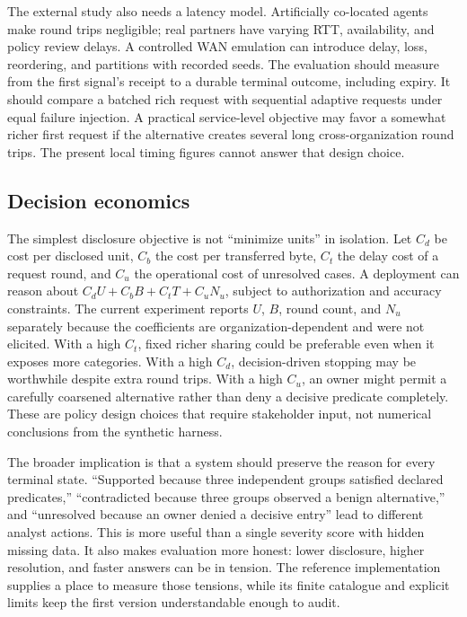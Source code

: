 \documentclass[conference,letterpaper]{IEEEtran}
\begin{document}
The external study also needs a latency model. Artificially co-located agents make round trips negligible; real partners have varying RTT, availability, and policy review delays. A controlled WAN emulation can introduce delay, loss, reordering, and partitions with recorded seeds. The evaluation should measure from the first signal's receipt to a durable terminal outcome, including expiry. It should compare a batched rich request with sequential adaptive requests under equal failure injection. A practical service-level objective may favor a somewhat richer first request if the alternative creates several long cross-organization round trips. The present local timing figures cannot answer that design choice.

\subsection{Decision economics}
The simplest disclosure objective is not ``minimize units'' in isolation. Let $C_d$ be cost per disclosed unit, $C_b$ the cost per transferred byte, $C_t$ the delay cost of a request round, and $C_u$ the operational cost of unresolved cases. A deployment can reason about $C_d U+C_b B+C_t T+C_u N_u$, subject to authorization and accuracy constraints. The current experiment reports $U$, $B$, round count, and $N_u$ separately because the coefficients are organization-dependent and were not elicited. With a high $C_t$, fixed richer sharing could be preferable even when it exposes more categories. With a high $C_d$, decision-driven stopping may be worthwhile despite extra round trips. With a high $C_u$, an owner might permit a carefully coarsened alternative rather than deny a decisive predicate completely. These are policy design choices that require stakeholder input, not numerical conclusions from the synthetic harness.

The broader implication is that a system should preserve the reason for every terminal state. ``Supported because three independent groups satisfied declared predicates,'' ``contradicted because three groups observed a benign alternative,'' and ``unresolved because an owner denied a decisive entry'' lead to different analyst actions. This is more useful than a single severity score with hidden missing data. It also makes evaluation more honest: lower disclosure, higher resolution, and faster answers can be in tension. The reference implementation supplies a place to measure those tensions, while its finite catalogue and explicit limits keep the first version understandable enough to audit.
\fi
\end{document}
